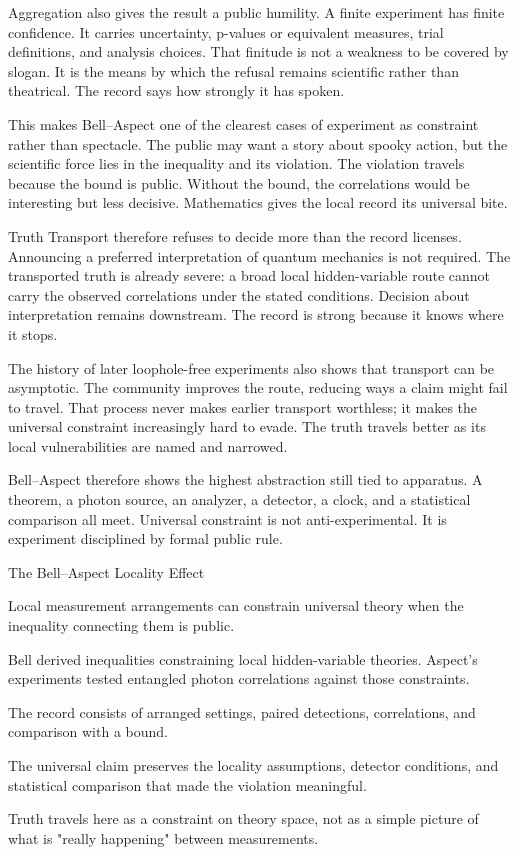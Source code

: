 Aggregation also gives the result a public humility. A finite experiment
has finite confidence. It carries uncertainty, p-values or equivalent
measures, trial definitions, and analysis choices. That finitude is not
a weakness to be covered by slogan. It is the means by which the refusal
remains scientific rather than theatrical. The record says how strongly
it has spoken.

This makes Bell--Aspect one of the clearest cases of experiment as
constraint rather than spectacle. The public may want a story about
spooky action, but the scientific force lies in the inequality and its
violation. The violation travels because the bound is public. Without
the bound, the correlations would be interesting but less decisive.
Mathematics gives the local record its universal bite.

Truth Transport therefore refuses to decide more than the record
licenses. Announcing a preferred interpretation of quantum mechanics is
not required. The transported truth is already severe: a broad local
hidden-variable route cannot carry the observed correlations under the
stated conditions. Decision about interpretation remains downstream. The
record is strong because it knows where it stops.

The history of later loophole-free experiments also shows that transport
can be asymptotic. The community improves the route, reducing ways a
claim might fail to travel. That process never makes earlier transport
worthless; it makes the universal constraint increasingly hard to evade.
The truth travels better as its local vulnerabilities are named and
narrowed.

Bell--Aspect therefore shows the highest abstraction still tied to apparatus. A theorem, a photon source, an
analyzer, a detector, a clock, and a statistical comparison all meet.
Universal constraint is not anti-experimental. It is experiment
disciplined by formal public rule.

\begin{phenom}{The Bell--Aspect Locality Effect~\cite{aspect1982,bell1964}}
\label{ph:bell-aspect-locality}

\PhStatement
Local measurement arrangements can constrain universal theory when the
inequality connecting them is public.

\PhOrigin
Bell derived inequalities constraining local hidden-variable theories. Aspect's
experiments tested entangled photon correlations against those constraints.

\PhObservation
The record consists of arranged settings, paired detections, correlations, and
comparison with a bound.

\PhConstraint
The universal claim preserves the locality assumptions, detector conditions,
and statistical comparison that made the violation meaningful.

\PhConsequence
Truth travels here as a constraint on theory space, not as a simple picture of
what is "really happening" between measurements.
\end{phenom}

